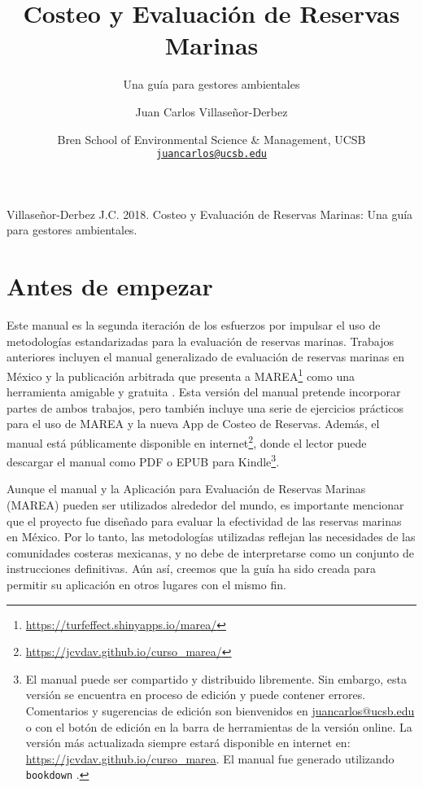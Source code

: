 \documentclass[]{krantz}
\title{Costeo y Evaluación de Reservas Marinas}
\subtitle{Una guía para gestores ambientales}
\author{Juan Carlos Villaseñor-Derbez}
\date{Bren School of Environmental Science \& Management, UCSB
\href{mailto:juancarlos@ucsb.edu}{\nolinkurl{juancarlos@ucsb.edu}}}
\renewcommand{\href}[2]{#2\footnote{\url{#1}}}
\begin{document}
\maketitle

\thispagestyle{empty}
\begin{center}
Villaseñor-Derbez J.C. 2018. Costeo y Evaluación de Reservas Marinas: Una guía para gestores ambientales.
\end{center}

\setlength{\abovedisplayskip}{-5pt}
\setlength{\abovedisplayshortskip}{-5pt}

{
\setcounter{tocdepth}{2}
\tableofcontents
}
\hypertarget{antes-de-empezar}{%
\chapter*{Antes de empezar}\label{antes-de-empezar}}


Este manual es la segunda iteración de los esfuerzos por impulsar el uso
de metodologías estandarizadas para la evaluación de reservas marinas.
Trabajos anteriores incluyen el manual generalizado de evaluación de
reservas marinas en México \citep{villaseorderbez_2017} y la publicación
arbitrada que presenta a
\href{https://turfeffect.shinyapps.io/marea/}{MAREA} como una
herramienta amigable y gratuita \citep{villasenorderbez_2018}. Esta
versión del manual pretende incorporar partes de ambos trabajos, pero
también incluye una serie de ejercicios prácticos para el uso de MAREA y
la nueva App de Costeo de Reservas. Además, el manual está públicamente
disponible en \href{https://jcvdav.github.io/curso_marea/}{internet},
donde el lector puede descargar el manual como PDF o EPUB para
Kindle\footnote{El manual puede ser compartido y distribuido libremente.
  Sin embargo, esta versión se encuentra en proceso de edición y puede
  contener errores. Comentarios y sugerencias de edición son bienvenidos
  en \url{juancarlos@ucsb.edu} o con el botón de edición en la barra de
  herramientas de la versión online. La versión más actualizada siempre
  estará disponible en internet en:
  \url{https://jcvdav.github.io/curso_marea}. El manual fue generado
  utilizando \texttt{bookdown} \citep{R-bookdown}.}.

Aunque el manual y la Aplicación para Evaluación de Reservas Marinas
(MAREA) pueden ser utilizados alrededor del mundo, es importante
mencionar que el proyecto fue diseñado para evaluar la efectividad de
las reservas marinas en México. Por lo tanto, las metodologías
utilizadas reflejan las necesidades de las comunidades costeras
mexicanas, y no debe de interpretarse como un conjunto de instrucciones
definitivas. Aún así, creemos que la guía ha sido creada para permitir
su aplicación en otros lugares con el mismo fin.
\end{document}
